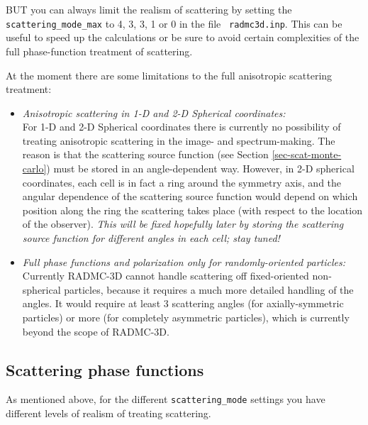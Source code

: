 \documentclass{report}
\begin{document}
BUT you can always limit the realism of scattering by setting the {\small\tt
  scattering\_mode\_max} to 4, 3, 3, 1 or 0 in the file {\small\tt
  radmc3d.inp}. This can be useful to speed up the calculations or be sure
to avoid certain complexities of the full phase-function treatment of
scattering.

At the moment there are some limitations to the full anisotropic scattering
treatment:
\begin{itemize}
\item {\em Anisotropic scattering in 1-D and 2-D Spherical coordinates:}\\
  For 1-D and 2-D Spherical coordinates there is currently no possibility of
  treating anisotropic scattering in the image- and spectrum-making.  The
  reason is that the scattering source function (see Section
  \ref{sec-scat-monte-carlo}) must be stored in an angle-dependent
  way. However, in 2-D spherical coordinates, each cell is in fact a ring
  around the symmetry axis, and the angular dependence of the scattering
  source function would depend on which position along the ring the
  scattering takes place (with respect to the location of the observer).
  {\em This will be fixed hopefully later by storing the scattering source
    function for different angles in each cell; stay tuned!}
\item {\em Full phase functions and polarization only for randomly-oriented particles:}\\
  Currently RADMC-3D cannot handle scattering off fixed-oriented
  non-spherical particles, because it requires a much more detailed handling
  of the angles. It would require at least 3 scattering angles (for
  axially-symmetric particles) or more (for completely asymmetric
  particles), which is currently beyond the scope of RADMC-3D.
\end{itemize}

\subsection{Scattering phase functions}
\label{sec-scat-phasefunc}
%
As mentioned above, for the different {\small\tt scattering\_mode} settings
you have different levels of realism of treating scattering. 
\end{document}
